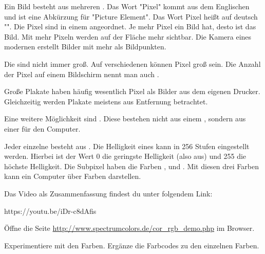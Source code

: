 \documentclass[a4paper, 12pt]{article}
\begin{document}
\large
\TITEL

\begin{LKtext}
	Ein Bild besteht aus mehreren . Das Wort "Pixel" kommt aus dem Englischen und ist eine Abkürzung für "Picture Element". Das Wort Pixel heißt auf deutsch  "". Die Pixel sind in einem  angeordnet. Je mehr Pixel ein Bild hat, desto  ist das Bild. Mit mehr Pixeln werden auf der  Fläche mehr  sichtbar. Die Kamera eines modernen  erstellt Bilder mit mehr als   Bildpunkten.
	
	Die  sind nicht immer  groß. Auf verschiedenen  können Pixel  groß sein. Die Anzahl der Pixel auf einem Bildschirm nennt man auch . 
	
	Große Plakate haben häufig wesentlich  Pixel als Bilder aus dem eigenen Drucker. Gleichzeitig werden Plakate meistens aus  Entfernung betrachtet.
	
	Eine weitere Möglichkeit sind . Diese bestehen nicht aus einem , sondern aus einer  für den Computer.
	
	Jeder einzelne  besteht aus  . Die Helligkeit eines  kann in 256 Stufen eingestellt werden. Hierbei ist der Wert 0 die geringste Helligkeit (also aus) und 255 die höchste Helligkeit. Die Subpixel haben die Farben ,  und . Mit diesen drei Farben kann ein Computer über   Farben darstellen.

\vspace{1cm}
Das Video als Zusammenfassung findest du unter folgendem Link:


https://youtu.be/iDr-c8dAfis

	\newpage
	Öffne die Seite \url{http://www.spectrumcolors.de/cor_rgb_demo.php} im Browser.
	
	Experimentiere mit den Farben. Ergänze die Farbcodes zu den einzelnen Farben.
	

\end{LKtext}
\end{document}

